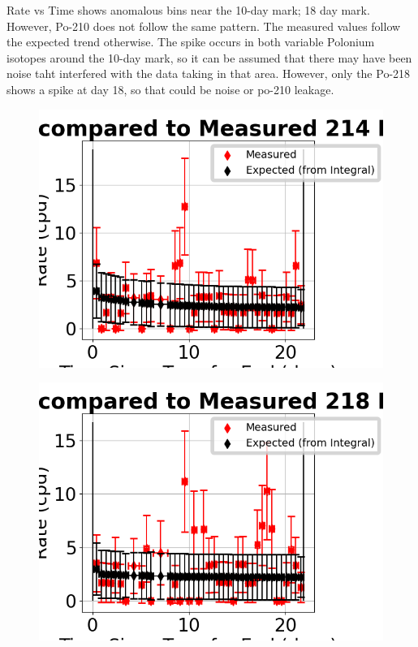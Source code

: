 \documentclass[letterpaper,12pt]{article}
\begin{document}
Rate vs Time shows anomalous bins near the 10-day mark; 18 day mark.
However, Po-210 does not follow the same pattern.
The measured values follow the expected trend otherwise.
The spike occurs in both variable Polonium isotopes around the 10-day mark,
so it can be assumed that there may have been noise taht interfered with
the data taking in that area.
However, only the Po-218 shows a spike at day 18, so that could be noise or 
po-210 leakage.
\begin{figure}[h]
\includegraphics[scale=0.4]{Expected_compared_to_Measured_214_Run_733_C.png}
\end{figure}
\begin{figure}
	\includegraphics[scale=0.4]{Expected_compared_to_Measured_218_Run_733_C.png}
\end{figure}
\end{document}
